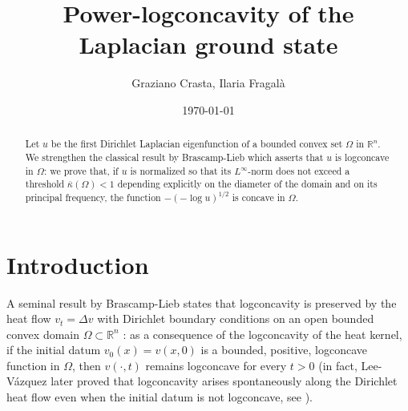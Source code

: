 \documentclass[11pt]{amsart}
\theoremstyle{definition}
\theoremstyle{remark}
\def\R{\mathbb{R}}
\def\Om{\Omega}
\def\k{\kappa}
\begin{document}
\title[]%
{Power-logconcavity of the Laplacian ground state} 

\author[G.~Crasta, I.~Fragal\`a]{Graziano Crasta,  Ilaria Fragal\`a}

\address[Graziano Crasta]{Dipartimento di Matematica ``G.\ Castelnuovo'',
Sapienza University of Rome\\
P.le A.\ Moro 5 -- 00185 Roma (Italy)}

\address[Ilaria Fragal\`a]{
Dipartimento di Matematica, Politecnico\\
Piazza Leonardo da Vinci, 32 --20133 Milano (Italy)
}


 	



\date{\today}


\begin{abstract}  Let $u$ be the first Dirichlet Laplacian eigenfunction of a bounded convex set $\Om$ in $\R ^n$.  We strengthen the classical result by Brascamp-Lieb which asserts that $u$ is logconcave in $\Om$: we prove that, if $u$ is normalized so that its $L^\infty$-norm  does not exceed a threshold 
$\overline \k (\Om)<1$ depending explicitly on the diameter of the domain and on its principal frequency, the function $- ( - \log u ) ^{1/2}$ is concave in $\Om$.  

 \end{abstract} 
\maketitle


\section{Introduction}

A seminal result by Brascamp-Lieb states that logconcavity is preserved by the heat flow $v _ t = \Delta v$ with Dirichlet boundary conditions
 on an open bounded convex domain $\Om \subset \R ^n$ \cite{BL}: as a consequence of the logconcavity of the heat kernel, 
 if the initial datum $v _0(x) = v (x, 0)$ is  a bounded, positive, logconcave function in $\Om$, then  $v (\cdot, t)$  remains logconcave for every $t>0$
(in fact,  Lee-V\'azquez   later proved 
   that logconcavity arises spontaneously  along the  Dirichlet heat flow even when the initial datum is not logconcave, see \cite{LV}).  
   
\end{document}
